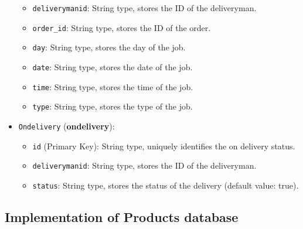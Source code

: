 \begin{itemize}
\begin{itemize}
        \item \texttt{deliverymanid}: String type, stores the ID of the deliveryman.
        \item \texttt{order\_id}: String type, stores the ID of the order.
        \item \texttt{day}: String type, stores the day of the job.
        \item \texttt{date}: String type, stores the date of the job.
        \item \texttt{time}: String type, stores the time of the job.
        \item \texttt{type}: String type, stores the type of the job.
    \end{itemize}
    \item \texttt{Ondelivery} (\textbf{ondelivery}):
    \begin{itemize}
        \item \texttt{id} (Primary Key): String type, uniquely identifies the on delivery status.
        \item \texttt{deliverymanid}: String type, stores the ID of the deliveryman.
        \item \texttt{status}: String type, stores the status of the delivery (default value: true).
    \end{itemize}
\end{itemize}

\subsection{Implementation of Products database}
 
